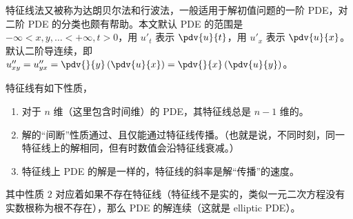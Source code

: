 
\begin{issues}
\issueMissDepend
\end{issues}

特征线法又被称为达朗贝尔法和行波法，一般适用于解初值问题的一阶 PDE，对二阶 PDE 的分类也颇有帮助。本文默认 PDE 的范围是 $-\infty < x, y, \dots < +\infty, t>0$，用 $u'_t$ 表示 $\pdv{u}{t}$，用 $u'_x$ 表示 $\pdv{u}{x}$。默认二阶导连续，即 $u''_{xy} = u''_{yx} = \pdv{}{y}\left(\pdv{u}{x}\right) = \pdv{}{x}\left(\pdv{u}{y}\right)$。

特征线有如下性质，
\begin{enumerate}
\item 对于 $n$ 维（这里包含时间维）的 PDE，其特征线总是 $n-1$ 维的。
\item 解的“间断”性质通过、且仅能通过特征线传播。（也就是说，不同时刻，同一特征线上的解相同，但有时数值会沿特征线衰减。）
\item 特征线上 PDE 的解是一样的，特征线的斜率是解“传播”的速度。
\end{enumerate}
其中性质 $2$ 对应着如果不存在特征线（特征线不是实的，类似一元二次方程没有实数根称为根不存在），那么 PDE 的解连续（这就是 elliptic PDE）。



































